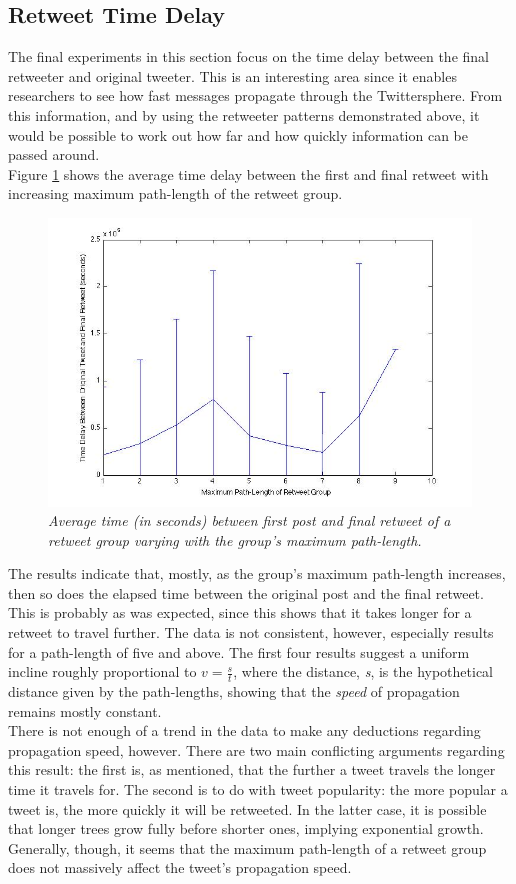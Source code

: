 \subsection{Retweet Time Delay}
\label{retweet time delay}
The final experiments in this section focus on the time delay between the final retweeter and original tweeter. This is an interesting area since it enables researchers to see how fast messages propagate through the Twittersphere. From this information, and by using the retweeter patterns demonstrated above, it would be possible to work out how far and how quickly information can be passed around.\\
Figure \ref{fig:timedelay-pathlength} shows the average time delay between the first and final retweet with increasing maximum path-length of the retweet group.\\
\begin{figure}[h]
\includegraphics[scale=0.35]{4.Chapter1/Media/pathlength-timedelay.jpg} 
\caption{\textit{Average time (in seconds) between first post and final retweet of a retweet group varying with the group's maximum path-length.}}
\label{fig:timedelay-pathlength}
\end{figure}
The results indicate that, mostly, as the group's maximum path-length increases, then so does the elapsed time between the original post and the final retweet. This is probably as was expected, since this shows that it takes longer for a retweet to travel further. The data is not consistent, however, especially results for a path-length of five and above. The first four results suggest a uniform incline roughly proportional to $ v=\frac{s}{t} $, where the distance, \textit{s}, is the hypothetical distance given by the path-lengths, showing that the \textit{speed} of propagation remains mostly constant.\\
There is not enough of a trend in the data to make any deductions regarding propagation speed, however. There are two main conflicting arguments regarding this result: the first is, as mentioned, that the further a tweet travels the longer time it travels for. The second is to do with tweet popularity: the more popular a tweet is, the more quickly it will be retweeted. In the latter case, it is possible that longer trees grow fully before shorter ones, implying exponential growth. Generally, though, it seems that the maximum path-length of a retweet group does not massively affect the tweet's propagation speed.

